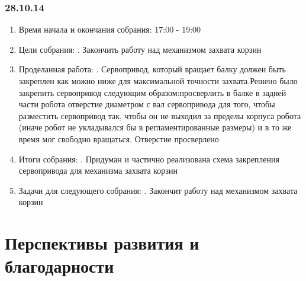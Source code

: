 \documentclass[12pt]{article}
\begin{document}
	          \subsubsection{28.10.14}
	          \begin{enumerate}
	          	\item Время начала и окончания собрания:
	          	17:00 - 19:00
	          	\newline
	          	\item Цели собрания:
	          	. Закончить работу над механизмом захвата корзин
	          	\item Проделанная работа:
	          	. Сервопривод, который вращает балку должен быть закреплен как можно ниже для максимальной точности захвата.Решено было закрепить сервопривод следующим образом:просверлить в балке в задней части робота отверстие диаметром с вал сервопривода для того, чтобы разместить сервопривод так, чтобы он не выходил за пределы корпуса робота (иначе робот не укладывался бы в регламентированные размеры) и в то же время мог свободно вращаться. Отверстие просверлено
	          	\item Итоги собрания:
	          	. Придуман и частично реализована схема закрепления сервопривода для механизма захвата корзин
	          	\item Задачи для следующего собрания:
	          	. Закончит работу над механизмом захвата корзин
	          \end{enumerate}
	          \newpage
	   \section{Перспективы развития и благодарности}

	   
	   
\end{document}
